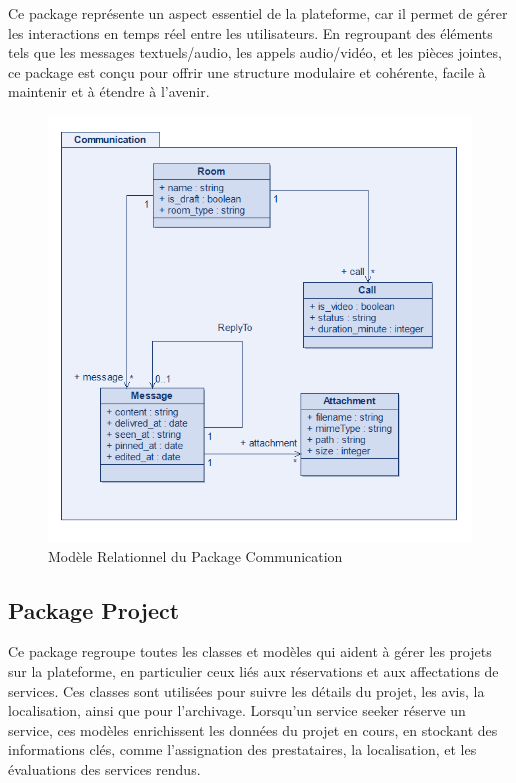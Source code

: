 {\vspace{0.35cm}

Ce package représente un aspect essentiel de la plateforme, car il permet de gérer les interactions en temps réel entre les utilisateurs. En regroupant des éléments tels que les messages textuels/audio, les appels audio/vidéo, et les pièces jointes, ce package est conçu pour offrir une structure modulaire et cohérente, facile à maintenir et à étendre à l'avenir.

\begin{figure}[H]
\begin{center}
\includegraphics[width=15cm]{assets/diagrams/CommunicationPackage.png}
\end{center}
\caption{Modèle Relationnel du Package Communication}
\end{figure}
\vspace{0.35cm}

\subsection{Package Project}
Ce package regroupe toutes les classes et modèles qui aident à gérer les projets sur la plateforme, en particulier ceux liés aux réservations et aux affectations de services. Ces classes sont utilisées pour suivre les détails du projet, les avis, la localisation, ainsi que pour l'archivage. Lorsqu'un service seeker réserve un service, ces modèles enrichissent les données du projet en cours, en stockant des informations clés, comme l'assignation des prestataires, la localisation, et les évaluations des services rendus.

}
